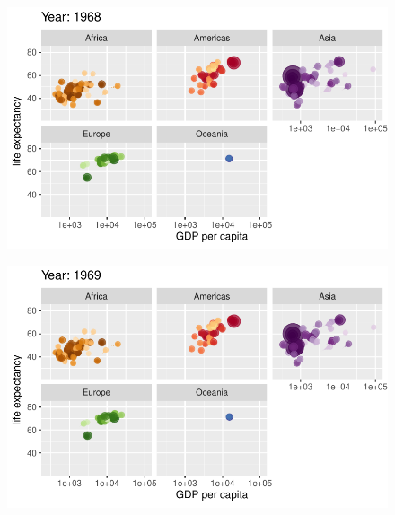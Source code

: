 \documentclass[
  letterpaper,
  DIV=11,
  numbers=noendperiod]{scrartcl}
\begin{document}
\begin{figure}[H]

{\centering \includegraphics{class05_files/figure-pdf/unnamed-chunk-24-30.pdf}

}

\end{figure}

\begin{figure}[H]

{\centering \includegraphics{class05_files/figure-pdf/unnamed-chunk-24-31.pdf}

}

\end{figure}
\end{document}
